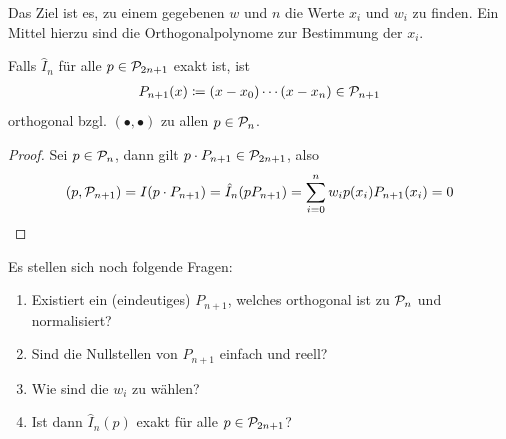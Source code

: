 Das Ziel ist es, zu einem gegebenen $w$ und $n$
die Werte $x_i$ und $w_i$ zu finden.
Ein Mittel hierzu sind die Orthogonalpolynome
zur Bestimmung der $x_i$.


\begin{Leme}
  \label{7.4.3}
  Falls $\hat{I}_n$ für alle $p\in\mathcal{P}_{2n+1}$ exakt ist, ist 
  \begin{gather*}
    P_{n+1}(x)\coloneqq (x-x_0)\dotsm(x-x_n)\in\mathcal{P}_{n+1}
  \end{gather*}
  orthogonal bzgl. $(\bullet,\bullet)$ zu allen $p\in\mathcal{P}_n$.
\end{Leme}
\begin{proof}
  Sei $p\in\mathcal{P}_n$, dann gilt 
  $p\cdot P_{n+1}\in\mathcal{P}_{2n+1}$, also 
  \begin{gather*}
    (p,\mathcal{P}_{n+1})=I(p\cdot P_{n+1})
    = \hat{I}_n(pP_{n+1})
    =\sum_{i=0}^nw_ip(x_i)P_{n+1}(x_i) 
    = 0
  \end{gather*}
\end{proof}

  Es stellen sich noch folgende Fragen:
  \begin{enumerate}
  \item Existiert ein (eindeutiges) $P_{n+1}$,
    welches orthogonal ist zu $\mathcal{P}_n$ und normalisiert?
  \item Sind die Nullstellen von $P_{n+1}$ einfach und reell?
  \item Wie sind die $w_i$ zu wählen?
  \item Ist dann $\hat{I}_n(p)$ exakt für alle $p\in\mathcal{P}_{2n+1}$?
  \end{enumerate}

